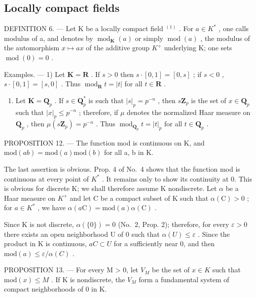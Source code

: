 \subsection{Locally compact fields}

DEFINITION 6. --- Let K be a locally compact field \(^{(1)}\) . For \(a \in K^{*}\) , one calls modulus of a, and denotes by \(\operatorname{mod}_{\mathbf{K}}(a)\) or simply \(\operatorname{mod}(a)\) , the modulus of the automorphism \(x \mapsto ax\) of the additive group \(K^{+}\) underlying K; one sets \(\operatorname{mod}(0) = 0\) .

Examples. --- 1) Let \(\mathbf{K} = \mathbf{R}\) . If \(s > 0\) then \(s \cdot [0,1] = [0,s]\) ; if \(s < 0\) , \(s \cdot [0,1] = [s,0]\) . Thus \(\operatorname{mod}_{\mathbf{R}} t = |t|\) for all \(t \in \mathbf{R}\) .

\begin{enumerate}
\def\labelenumi{\arabic{enumi})}
\setcounter{enumi}{1}
\tightlist
\item
  Let \(\mathbf{K} = \mathbf{Q}_p\) . If \(s \in \mathbf{Q}_p^*\) is such that \(|s|_p = p^{-n}\) , then \(s\mathbf{Z}_p\) is the set of \(x \in \mathbf{Q}_p\) such that \(|x|_p \leqslant p^{-n}\) ; therefore, if \(\mu\) denotes the normalized Haar measure on \(\mathbf{Q}_p\) , then \(\mu(s\mathbf{Z}_p) = p^{-n}\) . Thus \(\operatorname{mod}_{\mathbf{Q}_p} t = |t|_p\) for all \(t \in \mathbf{Q}_p\) .
\end{enumerate}

PROPOSITION 12. --- The function mod is continuous on K, and \(\text{mod}(ab) = \text{mod}(a)\text{mod}(b)\) for all a, b in K.

The last assertion is obvious. Prop. 4 of No.~4 shows that the function mod is continuous at every point of \(K^{*}\) . It remains only to show its continuity at 0. This is obvious for discrete K; we shall therefore assume K nondiscrete. Let \(\alpha\) be a Haar measure on \(K^{+}\) and let C be a compact subset of K such that \(\alpha(\mathrm{C}) > 0\) ; for \(a \in K^{*}\) , we have \(\alpha(a\mathrm{C}) = \mathrm{mod}(a)\alpha(\mathrm{C})\) .

Since K is not discrete, \(\alpha(\{0\}) = 0\) (No.~2, Prop. 2); therefore, for every \(\varepsilon > 0\) there exists an open neighborhood U of 0 such that \(\alpha(U) \leqslant \varepsilon\) . Since the product in K is continuous, \(aC \subset U\) for a sufficiently near 0, and then \(\text{mod}(a) \leqslant \varepsilon / \alpha(C)\) .

PROPOSITION 13. --- For every M \textgreater{} 0, let \(V_{M}\) be the set of \(x \in K\) such that \(\text{mod}(x) \leqslant M\) . If K is nondiscrete, the \(V_{M}\) form a fundamental system of compact neighborhoods of 0 in K.

